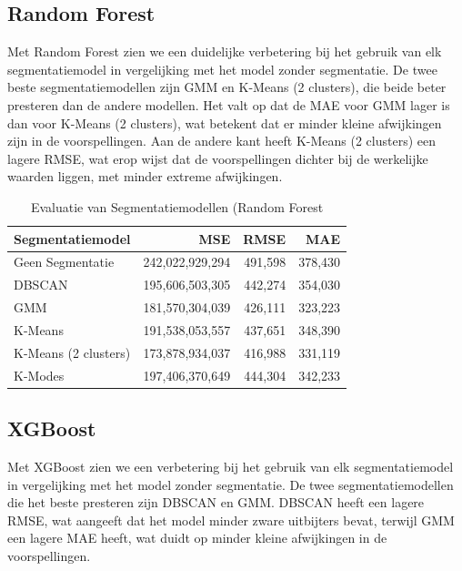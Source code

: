 \subsection*{Random Forest}

Met Random Forest zien we een duidelijke verbetering bij het gebruik van elk segmentatiemodel in vergelijking met het model zonder segmentatie. De twee beste segmentatiemodellen zijn GMM en K-Means (2 clusters), die beide beter presteren dan de andere modellen. Het valt op dat de MAE voor GMM lager is dan voor K-Means (2 clusters), wat betekent dat er minder kleine afwijkingen zijn in de voorspellingen. Aan de andere kant heeft K-Means (2 clusters) een lagere RMSE, wat erop wijst dat de voorspellingen dichter bij de werkelijke waarden liggen, met minder extreme afwijkingen.



\begin{table}[H]
    \centering
    \caption{Evaluatie van Segmentatiemodellen (Random Forest}
    \label{tab:rf_segmentation_model_evaluation}
    \begin{tabular}{|l|r|r|r|}
        \hline
        \textbf{Segmentatiemodel} & \textbf{MSE} & \textbf{RMSE} & \textbf{MAE} \\ \hline
        Geen Segmentatie         & 242,022,929,294 & 491,598 & 378,430 \\ \hline
        DBSCAN                   & 195,606,503,305 & 442,274 & 354,030 \\ \hline
        GMM                      & 181,570,304,039 & 426,111 & 323,223 \\ \hline
        K-Means                  & 191,538,053,557 & 437,651 & 348,390 \\ \hline
        K-Means (2 clusters)     & 173,878,934,037 & 416,988 & 331,119 \\ \hline
        K-Modes                  & 197,406,370,649 & 444,304 & 342,233 \\ \hline
    \end{tabular}
\end{table}

\subsection*{XGBoost}

Met XGBoost zien we een verbetering bij het gebruik van elk segmentatiemodel in vergelijking met het model zonder segmentatie. De twee segmentatiemodellen die het beste presteren zijn DBSCAN en GMM. DBSCAN heeft een lagere RMSE, wat aangeeft dat het model minder zware uitbijters bevat, terwijl GMM een lagere MAE heeft, wat duidt op minder kleine afwijkingen in de voorspellingen. 

